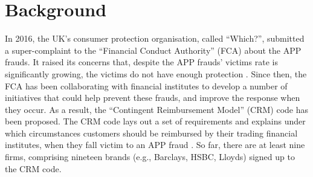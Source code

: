 
\section{Background}


In  2016, the UK's consumer protection organisation, called ``Which?'', submitted a super-complaint to the ``Financial Conduct Authority'' (FCA) about the APP frauds. It raised its concerns that, despite the APP frauds' victims rate is significantly growing, the victims do not have enough protection \cite{Which?-super-complaint}.  Since then, the FCA has been collaborating with financial institutes  to develop a number of initiatives that
could help prevent these frauds, and improve the response when they  occur. As a result,  the ``Contingent Reimbursement Model'' (CRM) code has been proposed. The  CRM code  lays out a set of requirements and explains under which circumstances customers should be reimbursed by their trading financial institutes, when they fall victim to an APP fraud \cite{CRM-code}. So far,  there are at least nine firms, comprising nineteen brands (e.g., Barclays, HSBC,  Lloyds) signed up to the CRM code. 